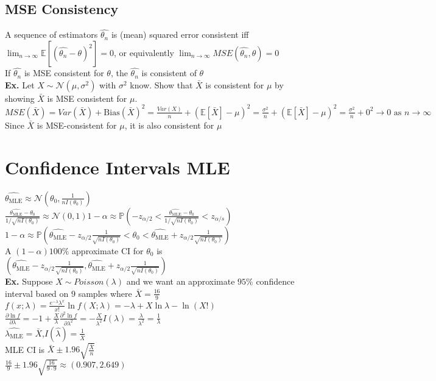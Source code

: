 \documentclass{article}
\begin{document}
\subsection{MSE Consistency}
A sequence of estimators $\hat{\theta_n}$ is (mean) squared error consistent iff\\
\hspace*{0.25in}$\lim_{n\rightarrow\infty}\mathbb{E}[(\hat{\theta_n}-\theta)^2]=0$, or equivalently $\lim_{n\rightarrow\infty}MSE(\hat{\theta_n},\theta)=0$\\
If $\hat{\theta_n}$ is MSE consistent for $\theta$, the $\hat{\theta_n}$ is consistent of $\theta$\\
\textbf{Ex.} Let $X\sim\mathcal{N}(\mu,\sigma^2)$ with $\sigma^2$ know. Show that $\bar X$ is consistent for $\mu$ by showing $\bar X$ is MSE consistent for $\mu$.\\
$MSE(\bar X)=Var(\bar X)+\text{Bias}(\bar X)^2=\frac{Var(X)}{n}+(\mathbb{E}[\bar X]-\mu)^2=\frac{\sigma^2}{n}+(\mathbb{E}[\bar X]-\mu)^2=\frac{\sigma^2}{n}+0^2\rightarrow0\text{ as }n\rightarrow\infty$\\
Since $\bar X$ is MSE-consistent for $\mu$, it is also consistent for $\mu$
\section{Confidence Intervals MLE}
\label{sec:confidence}
$\hat{\theta_\text{MLE}}\approx\mathcal{N}(\theta_0,\frac{1}{nI(\theta_0)})$\\
$\frac{\hat{\theta_\text{MLE}}-\theta_0}{1/\sqrt{nI(\theta_0)}}\approx\mathcal{N}(0,1)$\hspace*{0.5in}$1-\alpha\approx\mathbb{P}(-z_{\alpha/2}<\frac{\hat{\theta_\text{MLE}}-\theta_0}{1/\sqrt{nI(\theta_0)}}<z_{\alpha/s})$\\
$1-\alpha\approx\mathbb{P}(\hat{\theta_\text{MLE}}-z_{\alpha/2}\frac{1}{\sqrt{nI(\theta_0)}}<\theta_0<\hat{\theta_\text{MLE}}+z_{\alpha/2}\frac{1}{\sqrt{nI(\theta_0)}})$\\
A $(1-\alpha)100\%$ approximate CI for $\theta_0$ is $(\hat{\theta_\text{MLE}}-z_{\alpha/2}\frac{1}{\sqrt{nI(\theta_0)}},\hat{\theta_\text{MLE}}+z_{\alpha/2}\frac{1}{\sqrt{nI(\theta_0)}})$\\
\textbf{Ex.} Suppose $X\sim Poisson(\lambda)$ and we want an approximate $95\%$ confidence interval based on $9$ samples where $\bar X=\frac{16}{9}$\\
$f(x;\lambda)=\frac{e^{-\lambda}\lambda^x}{x!}$\hspace*{0.25in}$\ln f(X;\lambda)=-\lambda+X\ln\lambda-\ln(X!)$\\
$\frac{\partial\ln f}{\partial\lambda}=-1+\frac{X}{\lambda}$\hspace*{0.25in}$\frac{\partial^2\ln f}{\partial\lambda^2}=-\frac{X}{\lambda^2}$\hspace*{0.25in}$I(\lambda)=\frac{\lambda}{\lambda^2}=\frac{1}{\lambda}$\\
$\hat{\lambda_\text{MLE}}=\bar X$,$I(\hat\lambda)=\frac{1}{\bar X}$\\
MLE CI is $\bar X\pm1.96\sqrt{\frac{\bar X}{n}}$\\
$\frac{16}{9}\pm1.96\sqrt{\frac{16}{9\cdot9}}\approx(0.907,2.649)$
\end{document}
